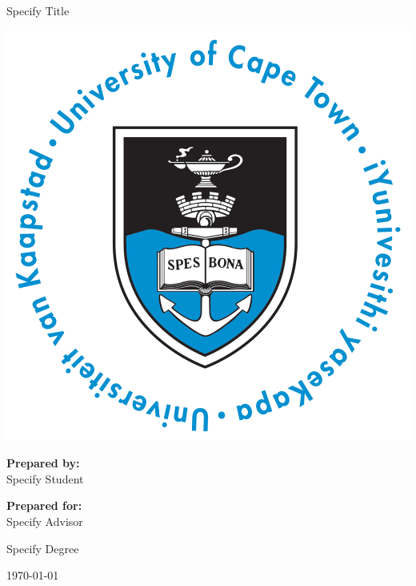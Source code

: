 \thispagestyle{empty}
\begin{center}

    \Huge

    \vspace{5cm}

    Specify Title

    \vspace{2.5cm}

    \includegraphics[width=0.4\linewidth]{FrontMatter/UCT_logo.png}

    \vfill

    \large
    \textbf{Prepared by:}\\
    Specify Student

    \vspace{1cm}

    \textbf{Prepared for:}\\
    Specify Advisor

    \vspace{2cm}

    \small
    Specify Degree

    \vspace{2cm}

    \today


\end{center}